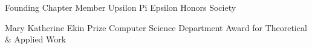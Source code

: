 



\begin{cvhonors}

  \cvhonor
    {Founding Chapter Member} %
    {Upsilon Pi Epsilon Honors Society} %

  \cvhonor
    {Mary Katherine Ekin Prize} %
    {Computer Science Department Award for Theoretical \& Applied Work} %

\end{cvhonors}


